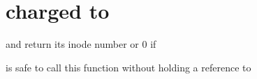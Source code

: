 \chapter{charged to }
\hypertarget{is}{}\label{is}
and return its inode number or 0 if

is safe to call this function without holding a reference to 